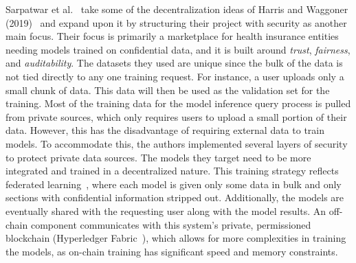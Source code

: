 \documentclass{ledger}
\begin{document}
Sarpatwar et al.~\cite{priceOfTrust} take some of the decentralization ideas of Harris and Waggoner (2019)~\cite{sharingModels} and expand upon it by structuring their project with security as another main focus. Their focus is primarily a marketplace for health insurance entities needing models trained on confidential data, and it is built around \textit{trust}, \textit{fairness}, and \textit{auditability}.
%
The datasets they used are unique since the bulk of the data is not tied directly to any one training request.
For instance, a user uploads only a small chunk of data. This data will then be used as the validation set for the training. Most of the training data for the model inference query process is pulled from private sources, which only requires users to upload a small portion of their data. However, this has the disadvantage of requiring external data to train models. To accommodate this, the authors implemented several layers of security to protect private data sources.
%
The models they target need to be more integrated and trained in a decentralized nature. This training strategy reflects federated learning~\cite{yang2019federated}, where each model is given only some data in bulk and only sections with confidential information stripped out.
Additionally, the models are eventually shared with the requesting user along with the model results.
%
An off-chain component communicates with this system's private, permissioned blockchain (Hyperledger Fabric~\cite{androulaki2018hyperledger}), which allows for more complexities in training the models, as on-chain training has significant speed and memory constraints.
\end{document}

